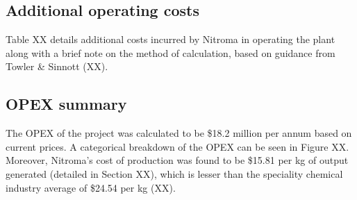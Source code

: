 \subsection{Additional operating costs}
Table XX details additional costs incurred by Nitroma in operating the plant along with a brief note on the method of calculation, based on guidance from Towler \& Sinnott (XX).

\subsection{OPEX summary}
The OPEX of the project was calculated to be \$18.2 million per annum based on current prices. A categorical breakdown of the OPEX can be seen in Figure XX. Moreover, Nitroma's cost of production was found to be \$15.81 per kg of output generated (detailed in Section XX), which is lesser than the speciality chemical industry average of \$24.54 per kg (XX).